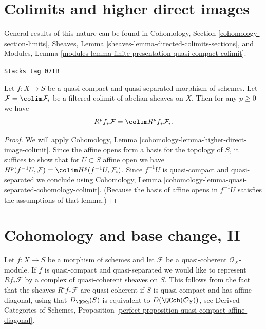 \section{Colimits and higher direct images}
\label{coherent-section-colimits}
General results of this nature can be found in
Cohomology, Section \ref{cohomology-section-limits},
Sheaves, Lemma \ref{sheaves-lemma-directed-colimits-sections}, and
Modules, Lemma \ref{modules-lemma-finite-presentation-quasi-compact-colimit}.

\begin{lemma}
\label{coherent-lemma-colimit-cohomology}
\href{https://stacks.math.columbia.edu/tag/07TB}{\texttt{Stacks tag 07TB}}

Let $f : X \to S$ be a quasi-compact and quasi-separated morphism of schemes.
Let $\mathcal{F} = \colim \mathcal{F}_i$ be a filtered colimit
of abelian sheaves on $X$. Then for any $p \geq 0$ we have
$$
R^pf_*\mathcal{F} = \colim R^pf_*\mathcal{F}_i.
$$
\end{lemma}

\begin{proof}
We will apply Cohomology, Lemma
\ref{cohomology-lemma-higher-direct-image-colimit}.
Since the affine opens form a basis for the topology of $S$,
it suffices to show that for $U \subset S$ affine open we have
$H^p(f^{-1}U, \mathcal{F}) = \colim H^p(f^{-1}U, \mathcal{F}_i)$.
Since $f^{-1}U$ is quasi-compact and quasi-separated we conclude
using
Cohomology, Lemma \ref{cohomology-lemma-quasi-separated-cohomology-colimit}.
(Because the basis of affine opens in $f^{-1}U$
satisfies the assumptions of that lemma.)
\end{proof}

\section{Cohomology and base change, II}
\label{coherent-section-cohomology-and-base-change-derived}
Let $f : X \to S$ be a morphism of schemes and let $\mathcal{F}$
be a quasi-coherent $\mathcal{O}_X$-module. If $f$ is quasi-compact
and quasi-separated we would like to represent $Rf_*\mathcal{F}$
by a complex of quasi-coherent sheaves on $S$. This follows
from the fact that the sheaves $R^if_*\mathcal{F}$ are quasi-coherent
if $S$ is quasi-compact and has affine diagonal,
using that $D_\QCoh(S)$ is equivalent to
$D(\QCoh(\mathcal{O}_S))$, see
Derived Categories of Schemes, Proposition
\ref{perfect-proposition-quasi-compact-affine-diagonal}.

